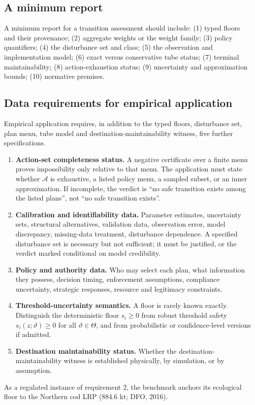 \subsection{A minimum report}

A minimum report for a transition assessment should include: (1) typed floors and their provenance; (2) aggregate weights or the weight family; (3) policy quantifiers; (4) the disturbance set and class; (5) the observation and implementation model; (6) exact versus conservative tube status; (7) terminal maintainability; (8) action-exhaustion status; (9) uncertainty and approximation bounds; (10) normative premises.

\subsection{Data requirements for empirical application}

Empirical application requires, in addition to the typed floors, disturbance set, plan menu, tube model and destination-maintainability witness, five further specifications.
\begin{enumerate}[leftmargin=2em]
\item \textbf{Action-set completeness status.} A negative certificate over a finite menu proves impossibility only relative to that menu. The application must state whether $\mathcal A$ is exhaustive, a listed policy menu, a sampled subset, or an inner approximation. If incomplete, the verdict is ``no safe transition exists among the listed plans'', not ``no safe transition exists''.
\item \textbf{Calibration and identifiability data.} Parameter estimates, uncertainty sets, structural alternatives, validation data, observation error, model discrepancy, missing-data treatment, disturbance dependence. A specified disturbance set is necessary but not sufficient; it must be justified, or the verdict marked conditional on model credibility.
\item \textbf{Policy and authority data.} Who may select each plan, what information they possess, decision timing, enforcement assumptions, compliance uncertainty, strategic responses, resource and legitimacy constraints.
\item \textbf{Threshold-uncertainty semantics.} A floor is rarely known exactly. Distinguish the deterministic floor $s_i\ge0$ from robust threshold safety $s_i(z;\vartheta)\ge0$ for all $\vartheta\in\Theta$, and from probabilistic or confidence-level versions if admitted.
\item \textbf{Destination maintainability status.} Whether the destination-maintainability witness is established physically, by simulation, or by assumption.
\end{enumerate}
As a regulated instance of requirement 2, the benchmark anchors its ecological floor to the Northern cod LRP ($884.6$ kt; DFO, 2016).

